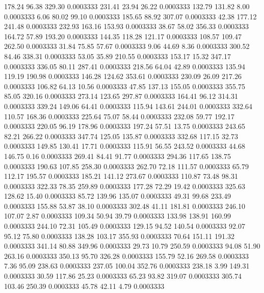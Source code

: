  178.24   96.38  329.30   0.0003333
 231.41   23.94   26.22   0.0003333
 132.79  131.82    8.00   0.0003333
   6.06   80.02   99.10   0.0003333
 185.65   88.92  307.07   0.0003333
  42.38  177.12  241.48   0.0003333
 232.93  163.16  153.93   0.0003333
  38.67   58.02  356.33   0.0003333
 164.72   57.89  193.20   0.0003333
 144.35  118.28  121.17   0.0003333
 108.57  109.47  262.50   0.0003333
  31.84   75.85   57.67   0.0003333
   9.06   44.69    8.36   0.0003333
 300.52   84.46  338.31   0.0003333
  53.05   35.89  210.55   0.0003333
 153.17   15.32  347.17   0.0003333
 336.05   80.11  287.41   0.0003333
 218.56   64.04   42.89   0.0003333
 135.94  119.19  190.98   0.0003333
 146.28  124.62  353.61   0.0003333
 230.09   26.09  217.26   0.0003333
 106.82   64.13   10.56   0.0003333
  47.85  137.13  155.05   0.0003333
 355.75   85.05  320.16   0.0003333
 273.14  123.65  297.87   0.0003333
 164.41   96.12  314.31   0.0003333
 339.24  149.06   64.41   0.0003333
 115.94  143.61  244.01   0.0003333
 332.64  110.57  168.36   0.0003333
 225.64   75.07   58.44   0.0003333
 232.08   59.77  192.17   0.0003333
 220.05   96.19  178.96   0.0003333
 197.24   57.51   13.75   0.0003333
 243.65   82.21  266.22   0.0003333
 347.74  125.05  135.87   0.0003333
 332.68  117.15   32.73   0.0003333
 149.85  130.41   17.71   0.0003333
 115.91   56.55  243.52   0.0003333
  44.68  146.75    0.16   0.0003333
 269.41   84.41   91.77   0.0003333
 294.36  117.65  138.75   0.0003333
 190.63  107.85  258.30   0.0003333
 262.70   72.18  111.57   0.0003333
  65.79  112.17  195.57   0.0003333
 185.21  141.12  273.67   0.0003333
 110.87   73.48   98.31   0.0003333
 322.33   78.35  259.89   0.0003333
 177.28   72.29   19.42   0.0003333
 325.63  128.62   15.40   0.0003333
  85.72  139.96  135.07   0.0003333
  49.31   99.68  233.49   0.0003333
 155.88   53.87   38.10   0.0003333
 302.48   41.11  181.81   0.0003333
 246.10  107.07    2.87   0.0003333
 109.34   50.94   39.79   0.0003333
 133.98  138.91  160.99   0.0003333
 244.10   72.31  105.49   0.0003333
 129.15   94.52  140.54   0.0003333
  92.07   95.12   75.80   0.0003333
 138.28  103.17  355.93   0.0003333
  70.64  151.11  191.32   0.0003333
 341.14   80.88  349.96   0.0003333
  29.73   10.79  250.59   0.0003333
  94.08   51.90  263.16   0.0003333
 350.13   95.70  326.28   0.0003333
 155.79   52.16  269.58   0.0003333
   7.36   95.09  238.63   0.0003333
 237.05  100.04  352.76   0.0003333
 238.18    3.99  149.31   0.0003333
  30.59  117.86   25.23   0.0003333
  65.23   93.82  319.07   0.0003333
 305.74  103.46  250.39   0.0003333
  45.78   42.11    4.79   0.0003333
